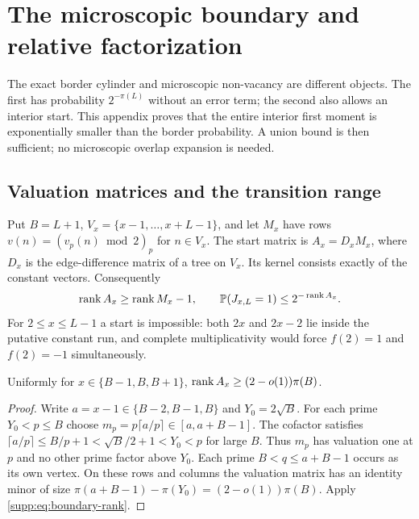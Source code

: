 \section{The microscopic boundary and relative factorization}\label{supp:sec:boundary}
The exact border cylinder and microscopic non-vacancy are different
objects. The first has probability $2^{-\pi(L)}$ without an error term;
the second also allows an interior start. This appendix proves that the
entire interior first moment is exponentially smaller than the border
probability. A union bound is then sufficient; no microscopic overlap
expansion is needed.

\subsection{Valuation matrices and the transition range}
Put $B=L+1$, $V_x=\{x-1,\ldots,x+L-1\}$, and let $M_x$ have rows
$v(n)=(v_p(n)\bmod2)_p$ for $n\in V_x$.
The start matrix is $A_x=D_xM_x$, where $D_x$ is the edge-difference
matrix of a tree on $V_x$. Its kernel consists exactly of the constant
vectors. Consequently
\begin{equation}\label{supp:eq:boundary-rank}
 \operatorname{rank} A_x\ge\operatorname{rank} M_x-1,\qquad
 \mathbb P(J_{x,L}=1)\le2^{-\operatorname{rank} A_x}.
\end{equation}
For $2\le x\le L-1$ a start is impossible: both $2x$ and $2x-2$
lie inside the putative constant run, and complete multiplicativity
would force $f(2)=1$ and $f(2)=-1$ simultaneously.

\begin{lemma}\label{supp:lem:transition}
Uniformly for $x\in\{B-1,B,B+1\}$,
$\operatorname{rank} A_x\ge(2-o(1))\pi(B)$.
\end{lemma}
\begin{proof}
Write $a=x-1\in\{B-2,B-1,B\}$ and $Y_0=2\sqrt B$.
For each prime $Y_0<p\le B$ choose
$m_p=p\lceil a/p\rceil\in[a,a+B-1]$.
The cofactor satisfies
$\lceil a/p\rceil\le B/p+1<\sqrt B/2+1<Y_0<p$ for large $B$.
Thus $m_p$ has valuation one at $p$ and no other prime factor above
$Y_0$. Each prime $B<q\le a+B-1$ occurs as its own vertex.
On these rows and columns the valuation matrix has an identity minor
of size $\pi(a+B-1)-\pi(Y_0)=(2-o(1))\pi(B)$.
Apply \eqref{supp:eq:boundary-rank}.
\end{proof}

